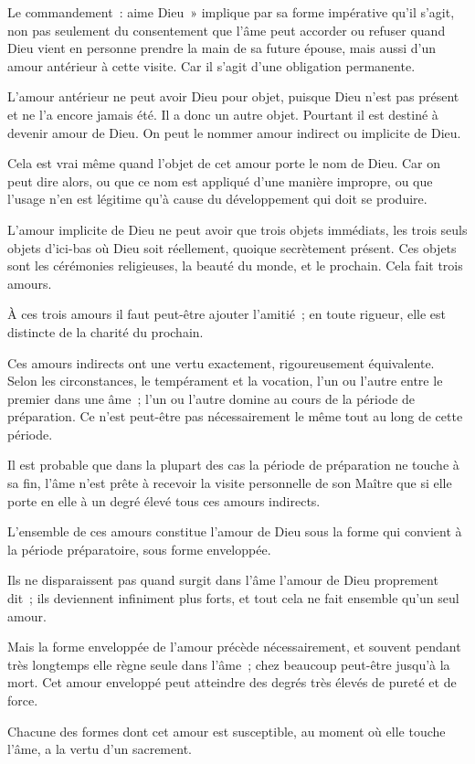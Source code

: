 \documentclass[french,twoside]{book} %
\newcommand\chaptercont{} %
\begin{document}
\chaptercont
\noindent Le commandement : aime Dieu » implique par sa forme impérative qu'il s'agit, non pas seulement du consentement que l'âme peut accorder ou refuser quand Dieu vient en personne prendre la main de sa future épouse, mais aussi d'un amour antérieur à cette visite. Car il s'agit d'une obligation permanente.\par
L'amour antérieur ne peut avoir Dieu pour objet, puisque Dieu n'est pas présent et ne l'a encore jamais été. Il a donc un autre objet. Pourtant il est destiné à devenir amour de Dieu. On peut le nommer amour indirect ou implicite de Dieu.\par
Cela est vrai même quand l'objet de cet amour porte le nom de Dieu. Car on peut dire alors, ou que ce nom est appliqué d'une manière impropre, ou que l'usage n'en est légitime qu'à cause du développement qui doit se produire.\par
L'amour implicite de Dieu ne peut avoir que trois objets immédiats, les trois seuls objets d'ici-bas où Dieu soit réellement, quoique secrètement présent. Ces objets sont les cérémonies religieuses, la beauté du monde, et le prochain. Cela fait trois amours.\par
À ces trois amours il faut peut-être ajouter l'amitié ; en toute rigueur, elle est distincte de la charité du prochain.\par
Ces amours indirects ont une vertu exactement, rigoureusement équivalente. Selon les circonstances, le tempérament et la vocation, l'un ou l'autre entre le premier dans une âme ; l'un ou l'autre domine au cours de la période de préparation. Ce n'est peut-être pas nécessairement le même tout au long de cette période.\par
Il est probable que dans la plupart des cas la période de préparation ne touche à sa fin, l'âme n'est prête à recevoir la visite personnelle de son Maître que si elle porte en elle à un degré élevé tous ces amours indirects.\par
L'ensemble de ces amours constitue l'amour de Dieu sous la forme qui convient à la période préparatoire, sous forme enveloppée.\par
Ils ne disparaissent pas quand surgit dans l'âme l'amour de Dieu proprement dit ; ils deviennent infiniment plus forts, et tout cela ne fait ensemble qu'un seul amour.\par
Mais la forme enveloppée de l'amour précède nécessairement, et souvent pendant très longtemps elle règne seule dans l'âme ; chez beaucoup peut-être jusqu'à la mort. Cet amour enveloppé peut atteindre des degrés très élevés de pureté et de force.\par
Chacune des formes dont cet amour est susceptible, au moment où elle touche l'âme, a la vertu d'un sacrement.\par
\end{document}

